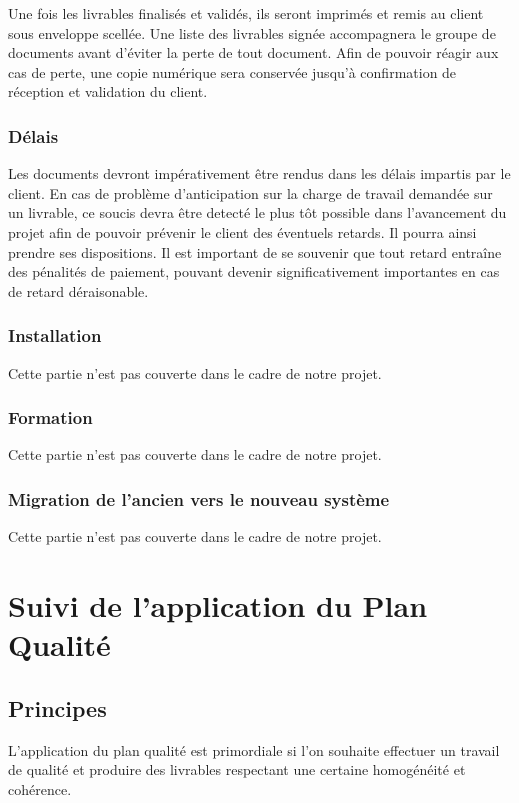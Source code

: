 \documentclass[a4paper]{article}
\begin{document}
Une fois les livrables finalisés et validés, ils seront imprimés et remis au client sous enveloppe scellée. Une liste des livrables signée accompagnera le groupe de documents avant d'éviter la perte de tout document. Afin de pouvoir réagir aux cas de perte, une copie numérique sera conservée jusqu'à confirmation de réception et validation du client.

\subsubsection{Délais}

Les documents devront impérativement être rendus dans les délais impartis par le client. En cas de problème d'anticipation sur la charge de travail demandée sur un livrable, ce soucis devra être detecté le plus tôt possible dans l'avancement du projet afin de pouvoir prévenir le client des éventuels retards. Il pourra ainsi prendre ses dispositions. Il est important de se souvenir que tout retard entraîne des pénalités de paiement, pouvant devenir significativement importantes en cas de retard déraisonable.

\subsubsection{Installation}
Cette partie n'est pas couverte dans le cadre de notre projet.

\subsubsection{Formation}
Cette partie n'est pas couverte dans le cadre de notre projet.

\subsubsection{Migration de l'ancien vers le nouveau système}
Cette partie n'est pas couverte dans le cadre de notre projet.

\section{Suivi de l'application du Plan Qualité}

\subsection{Principes}

L'application du plan qualité est primordiale si l'on souhaite effectuer un travail de qualité et produire des livrables respectant une certaine homogénéité et cohérence.
\end{document}
